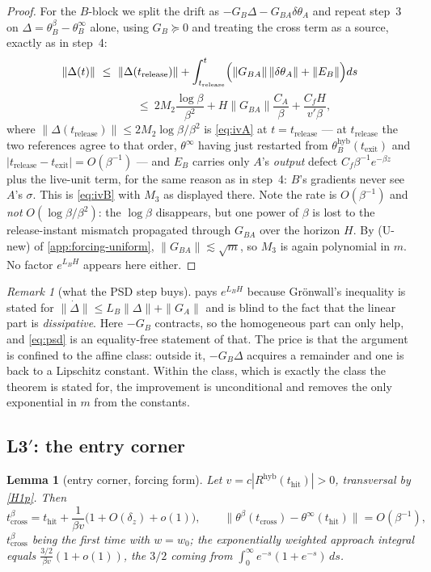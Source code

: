 \documentclass[11pt]{article}
\newtheorem{lemma}[lemma]{Lemma}
\theoremstyle{definition}
\theoremstyle{remark}
\newtheorem{remark}[remark]{Remark}
\newcommand{\thit}{t_{\mathrm{hit}}}
\newcommand{\texit}{t_{\mathrm{exit}}}
\newcommand{\trel}{t_{\mathrm{release}}}
\newcommand{\hyb}{\mathrm{hyb}}
\newcommand{\tcross}{t_{\mathrm{cross}}}
\begin{document}
\begin{proof}
For the $B$-block we split the drift as $-G_B\Delta-G_{BA}\delta\theta_A$ and
repeat step~3 on $\Delta=\theta_B^\beta-\theta_B^\infty$ alone, using
$G_B\succeq0$ and treating the cross term as a source, exactly as in step~4:
\[
\|\Delta(t)\|\ \le\ \|\Delta(\trel)\|
+\int_{\trel}^{t}\Bigl(\|G_{BA}\|\,\|\delta\theta_A\|+\|E_B\|\Bigr)ds
\]
\[
\qquad\qquad\ \le\ 2M_2\frac{\log\beta}{\beta^{2}}
+H\|G_{BA}\|\frac{C_A}{\beta}+\frac{C_fH}{v'\beta},
\]
where $\|\Delta(\trel)\|\le2M_2\log\beta/\beta^2$ is \eqref{eq:ivA} at
$t=\trel$ --- at $\trel$ the two references agree to that order, $\theta^\infty$
having just restarted from $\theta_B^{\hyb}(\texit)$ and
$|\trel-\texit|=O(\beta^{-1})$ --- and $E_B$ carries only $A$'s \emph{output}
defect $C_f\beta^{-1}e^{-\beta z}$ plus the live-unit term, for the same reason
as in step~4: $B$'s gradients never see $A$'s $\sigma$. This is \eqref{eq:ivB}
with $M_3$ as displayed there. Note the rate is $O(\beta^{-1})$ and \emph{not}
$O(\log\beta/\beta^2)$: the $\log\beta$ disappears, but one power of $\beta$ is
lost to the release-instant mismatch propagated through $G_{BA}$ over the
horizon $H$. By (U-new) of \cref{app:forcing-uniform},
$\|G_{BA}\|\lesssim\sqrt m$, so $M_3$ is again polynomial in $m$. No factor
$e^{L_BH}$ appears here either.
\end{proof}

\begin{remark}[what the PSD step buys]\label{rem:psdF}
 pays $e^{L_BH}$ because Gr\"onwall's inequality is stated
for $\|\dot\Delta\|\le L_B\|\Delta\|+\|G_A\|$ and is blind to the fact that the
linear part is \emph{dissipative}. Here $-G_B$ contracts, so the homogeneous
part can only help, and \eqref{eq:psd} is an equality-free statement of that.
The price is that the argument is confined to the affine class: outside it,
$-G_B\Delta$ acquires a remainder and one is back to a Lipschitz constant.
Within the class, which is exactly the class the theorem is stated for, the
improvement is unconditional and removes the only exponential in $m$ from the
constants.
\end{remark}

\subsection{L3$'$: the entry corner}\label{app:F3}

\begin{lemma}[entry corner, forcing form]\label{lem:corner-inF}
Let $v=c|R^{\hyb}(\thit)|>0$, transversal by \eqref{H1p}. Then
\begin{equation}\label{eq:corner-inF}
\tcross^\beta=\thit+\frac{1}{\beta v}\bigl(1+O(\delta_z)+o(1)\bigr),
\qquad
\|\theta^\beta(\tcross)-\theta^\infty(\thit)\|=O(\beta^{-1}),
\end{equation}
$\tcross^\beta$ being the first time with $w=w_0$; the exponentially weighted
approach integral equals $\tfrac{3/2}{\beta v}(1+o(1))$, the $3/2$ coming from
$\int_0^\infty e^{-s}(1+e^{-s})\,ds$.
\end{lemma}
\end{document}
